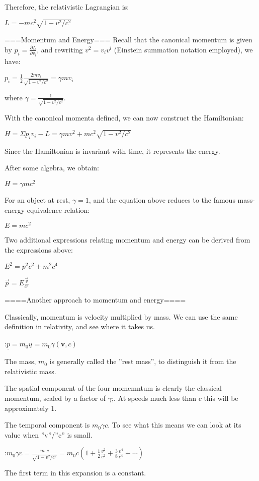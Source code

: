 \documentclass{article}
\begin{document}
Therefore, the relativistic Lagrangian is:

$L = -mc^2\sqrt{1-v^2/c^2}$

===Momentum and Energy===
Recall that the canonical momentum is given by $p_i = \frac{\partial L}{\partial v_i}$, and rewriting $v^2 = v_i v^i$ (Einstein summation notation employed), we have:

$p_i = \frac{1}{2}\frac{2mv_i}{\sqrt{1-v^2/c^2}} = \gamma mv_i$

where $\gamma=\frac{1}{\sqrt{1-v^2/c^2}}$.

With the canonical momenta defined, we can now construct the Hamiltonian:

$H = \Sigma p_i v_i - L = \gamma mv^2 + mc^2\sqrt{1-v^2/c^2}$

Since the Hamiltonian is invariant with time, it represents the energy.

After some algebra, we obtain:

$H = \gamma mc^2$

For an object at rest, $\gamma = 1$, and the equation above reduces to the famous mass-energy equivalence relation:

$E = mc^2$

Two additional expressions relating momentum and energy can be derived from the expressions above:

$E^2 = p^2c^2 + m^2c^4$

$\vec{p} = E\frac{\vec{v}}{c^2}$

====Another approach to momentum and energy====

Classically, momentum is velocity multiplied by mass. We can use the same definition in relativity, and see where it takes us.

:$\underline{p}=m_0 \underline{u}= m_0 \gamma (\mathbf{v}, c)$

The mass, $m_0$ is generally called the ''rest mass'', to distinguish it from the relativistic mass.

The spatial component of the four-momemntum is clearly the classical momentum, scaled by a factor of $\gamma$;. At speeds much less than $c$ this will be approximately 1.

The temporal component is $m_0\gamma c$. To see what this means we can look at its value when ''v''/''c'' is small.

:$m_0 \gamma c = \frac{m_0 c}{\sqrt{1-v^2/c^2}}= 
m_0 c \left( 1 + \frac{1}{2}\frac{v^2}{c^2} + \frac{3}{8}\frac{v^4}{c^4} + \cdots
\right) $

The first term in this expansion is a constant.
\end{document}
